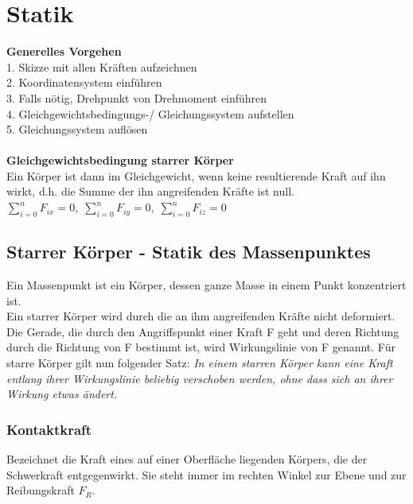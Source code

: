 \section{Statik}

\begin{multicols}{2}
\textbf{Generelles Vorgehen} \\
1. Skizze mit allen Kräften aufzeichnen \\
2. Koordinatensystem einführen \\
3. Falls nötig, Drehpunkt von Drehmoment einführen \\
4. Gleichgewichtsbedingungs-/ Gleichungssystem aufstellen \\
5. Gleichungssystem auflösen \\
\columnbreak
\\
\textbf{Gleichgewichtsbedingung starrer Körper} \\
Ein Körper ist dann im Gleichgewicht, wenn keine resultierende Kraft auf ihn wirkt, d.h. die Summe der ihn angreifenden Kräfte ist null. \\
$\sum\limits_{i=0}^{n} F_{ix} = 0,  \; \sum\limits_{i=0}^{n} F_{iy} = 0, \; \sum\limits_{i=0}^{n} F_{iz} = 0 $
\end{multicols}

\subsection{Starrer Körper - Statik des Massenpunktes}
Ein Massenpunkt ist ein Körper, dessen ganze Masse in 
einem Punkt konzentriert ist. \\
Ein starrer Körper wird durch die an ihm angreifenden 
Kräfte nicht deformiert. Die Gerade, die durch den Angriffspunkt einer Kraft F geht und 
deren Richtung durch die Richtung von F bestimmt ist, wird 
Wirkungslinie von  F genannt. Für starre Körper gilt nun 
folgender Satz:
\textit{In einem starren Körper kann eine Kraft entlang ihrer 
Wirkungslinie beliebig verschoben werden, ohne dass sich 
an ihrer Wirkung etwas ändert.} 



\subsubsection{Kontaktkraft}
Bezeichnet die Kraft eines auf einer Oberfläche liegenden Körpers, die der Schwerkraft entgegenwirkt. Sie steht immer im rechten Winkel zur Ebene und zur Reibungskraft $F_R$. \\


